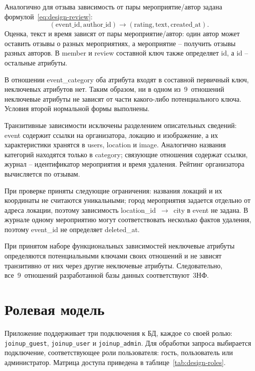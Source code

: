 Аналогично для отзыва зависимость от пары мероприятие/автор задана формулой~\eqref{eq:design-review}:
\begin{equation}
    (\text{event\_id}, \text{author\_id}) \rightarrow
    (\text{rating}, \text{text}, \text{created\_at}).
    \label{eq:design-review}
\end{equation}
Оценка, текст и время зависят от пары мероприятие/автор: один автор может оставить отзывы о разных мероприятиях, а мероприятие -- получить отзывы разных авторов. В member и review составной ключ также определяет id, а id -- остальные атрибуты.

В отношении event\_category оба атрибута входят в составной первичный ключ, неключевых атрибутов нет. Таким образом, ни в одном из~9~отношений неключевые атрибуты не зависят от части какого-либо потенциального ключа. Условия второй нормальной формы выполнены.

Транзитивные зависимости исключены разделением описательных сведений: event содержит ссылки на организатора, локацию и изображение, а их характеристики хранятся в users, location и image. Аналогично названия категорий находятся только в category; связующие отношения содержат ссылки, журнал -- идентификатор мероприятия и время удаления. Рейтинг организатора вычисляется по отзывам.

При проверке приняты следующие ограничения: названия локаций и их координаты не считаются уникальными; город мероприятия задается отдельно от адреса локации, поэтому зависимость location\_id~$\rightarrow$~city в event не задана. В журнале одному мероприятию могут соответствовать несколько фактов удаления, поэтому event\_id не определяет deleted\_at.

При принятом наборе функциональных зависимостей неключевые атрибуты определяются потенциальными ключами своих отношений и не зависят транзитивно от них через другие неключевые атрибуты. Следовательно, все~9~отношений разработанной базы данных соответствуют~3НФ.

\section{Ролевая модель}

Приложение поддерживает три подключения к БД, каждое со своей ролью: \texttt{joinup\_guest}, \texttt{joinup\_user} и \texttt{joinup\_admin}. Для обработки запроса выбирается подключение, соответствующее роли пользователя: гость, пользователь или администратор. Матрица доступа приведена в таблице~\ref{tab:design-roles}.

